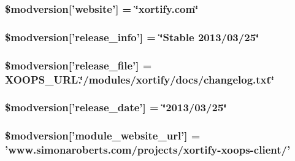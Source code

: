 \hypertarget{xoops__version_8php_a71a5da9d3a0c17c57f174d20d27f3be3}{
\subsubsection[{\$modversion}]{\setlength{\rightskip}{0pt plus 5cm}\$modversion\mbox{[}'website'\mbox{]} = \char`\"{}xortify.\-com\char`\"{}}}\label{xoops__version_8php_a71a5da9d3a0c17c57f174d20d27f3be3}
\hypertarget{xoops__version_8php_a123c91e534177f17f2f74d6f0608ba7a}{
\subsubsection[{\$modversion}]{\setlength{\rightskip}{0pt plus 5cm}\$modversion\mbox{[}'release\-\_\-info'\mbox{]} = \char`\"{}Stable 2013/03/25\char`\"{}}}\label{xoops__version_8php_a123c91e534177f17f2f74d6f0608ba7a}
\hypertarget{xoops__version_8php_ad5a8e1dbbf9b0a009bf8cf4479d02278}{
\subsubsection[{\$modversion}]{\setlength{\rightskip}{0pt plus 5cm}\$modversion\mbox{[}'release\-\_\-file'\mbox{]} = X\-O\-O\-P\-S\-\_\-\-U\-R\-L.\char`\"{}/modules/xortify/docs/changelog.\-txt\char`\"{}}}\label{xoops__version_8php_ad5a8e1dbbf9b0a009bf8cf4479d02278}
\hypertarget{xoops__version_8php_acb3338b35e8702eeb9add71947190f39}{
\subsubsection[{\$modversion}]{\setlength{\rightskip}{0pt plus 5cm}\$modversion\mbox{[}'release\-\_\-date'\mbox{]} = \char`\"{}2013/03/25\char`\"{}}}\label{xoops__version_8php_acb3338b35e8702eeb9add71947190f39}
\hypertarget{xoops__version_8php_a563f37b735830ef4c581ad9e434be79d}{
\subsubsection[{\$modversion}]{\setlength{\rightskip}{0pt plus 5cm}\$modversion\mbox{[}'module\-\_\-website\-\_\-url'\mbox{]} = 'www.\-simonaroberts.\-com/projects/xortify-\/xoops-\/client/'}}\label{xoops__version_8php_a563f37b735830ef4c581ad9e434be79d}
